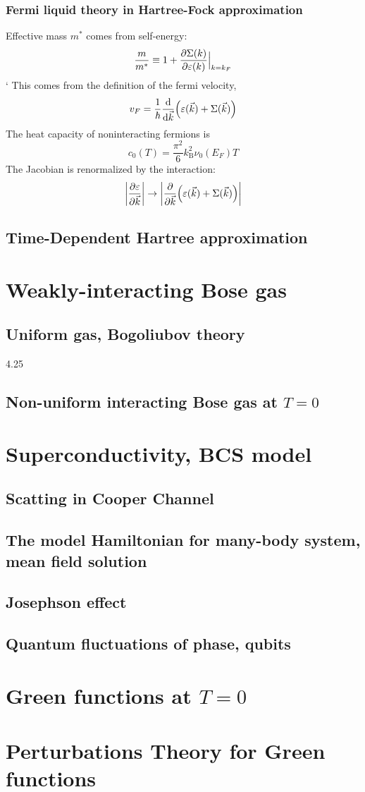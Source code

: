 \documentclass[10pt]{article}
\newcommand{\kb}{k_{\text{B}}}
\begin{document}
\subsubsection{Fermi liquid theory in Hartree-Fock approximation}
Effective mass $m^\ast$ comes from self-energy:
$$
\frac{m}{m^\ast} \equiv 1+ \pdv{\Sigma(k)}{\varepsilon(k)}\Big|_{k = k_F}
$$`
This comes from the definition of the fermi velocity,
$$
v_F = \frac{1}{\hbar}\dv{\vec k}(\varepsilon(\vec k)+\Sigma(\vec k))
$$
The heat capacity of noninteracting fermions is
$$
c_0(T) = \frac{\pi^2}{6}\kb^2\nu_0(E_F)T
$$
The Jacobian is renormalized by the interaction:
$$
\qty|\pdv{\varepsilon}{\vec k}| \to \qty|\pdv{\vec k}\qty(\varepsilon(\vec k)+ \Sigma(\vec k))|
$$
\subsection{Time-Dependent Hartree approximation}

\section{Weakly-interacting Bose gas}
\subsection{Uniform gas, Bogoliubov theory}
4.25
\subsection{Non-uniform interacting Bose gas at $T=0$}
\section{Superconductivity, BCS model}
\subsection{Scatting in Cooper Channel}
\subsection{The model Hamiltonian for many-body system, mean field solution}
\subsection{Josephson effect}
\subsection{Quantum fluctuations of phase, qubits}
\section{Green functions at $T=0$}
\section{Perturbations Theory for Green functions}
\end{document}
